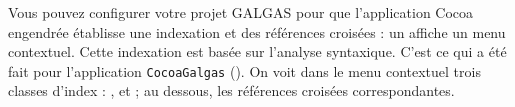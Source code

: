 %
%
%
%
%
%
%
%
%







Vous pouvez configurer votre projet GALGAS pour que l'application Cocoa engendrée établisse une indexation et des références croisées : un  affiche un menu contextuel. Cette indexation est basée sur l'analyse syntaxique. C'est ce qui a été fait pour l'application \texttt{CocoaGalgas} (). On voit dans le menu contextuel trois classes d'index : ,  et  ; au dessous, les références croisées correspondantes.


